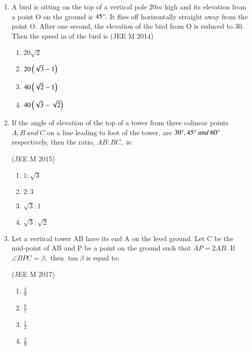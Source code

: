\documentclass[journal,12pt,twocolumn]{IEEEtran}
\theoremstyle{remark}
\begin{document}
\begin{enumerate}[start =3]
\item A bird is sitting on the top of a vertical pole $20m$ high and its elevation from a point O on the  ground is $45\degree.$ It flies off horizontally straight away from the point O. After one second, the elevation of the bird from O is reduced to {30\degree.} Then the speed in  of the bird is \hfill{(JEE M 2014)}
\begin{multicols}{2}
\begin{enumerate}
        \item $20\sqrt{2}$                    
        \item $20\left(\sqrt{3}-1\right)$ 
        \item $40\left(\sqrt{2}-1\right)$ 
        \item $40\left(\sqrt{3}-\sqrt{2}\right)$
\end{enumerate}
\end{multicols} 

\item If the angle of elevation of the top of a tower from three colinear points $A,B\:and\:C$ on a line leading to foot of the tower, are $30\degree,45\degree \: and \: 60\degree$ respectively, then the ratio, $AB:BC,$ is: 

\hfill{(JEE M 2015)}
\begin{multicols}{2}
\begin{enumerate}
        \item $1:\sqrt{3}$                    
        \item $2:3$ 
        \item $\sqrt{3}:1$ 
        \item $\sqrt{3}:\sqrt{2}$
\end{enumerate}
\end{multicols} 

\item Let a vertical tower AB have its end A on the level ground. Let C be the mid-point of AB and P be a point on the ground such that $AP=2AB.$ If $\angle{BPC}=\beta,$ then $\tan \beta$ is equal to:  

\hfill{(JEE M 2017)}
\begin{multicols}{4}
\begin{enumerate}
        \item $\frac{4}{9}$                    
        \item $\frac{6}{7}$ 
        \item $\frac{1}{4}$ 
        \item $\frac{2}{9}$
\end{enumerate}
\end{multicols} 


\end{enumerate}
\end{document}
